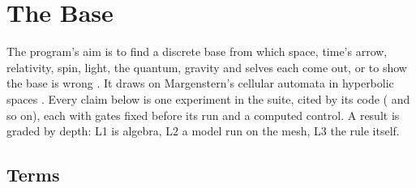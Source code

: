 \section{The Base}
\label{sec:base}

The program's aim is to find a discrete base from which space, time's arrow, relativity, spin, light, the quantum,
gravity and selves each come out, or to show the base is wrong \cite{pollard2026discrete, cluesurf2026repo}. It
draws on Margenstern's cellular automata in hyperbolic spaces \cite{margenstern2007vol1}. Every claim below is one
experiment in the suite, cited by its code ( and so on), each with gates fixed before its run and
a computed control. A result is graded by depth: L1 is algebra, L2 a model run on the mesh, L3 the rule itself.

\subsection{Terms}

